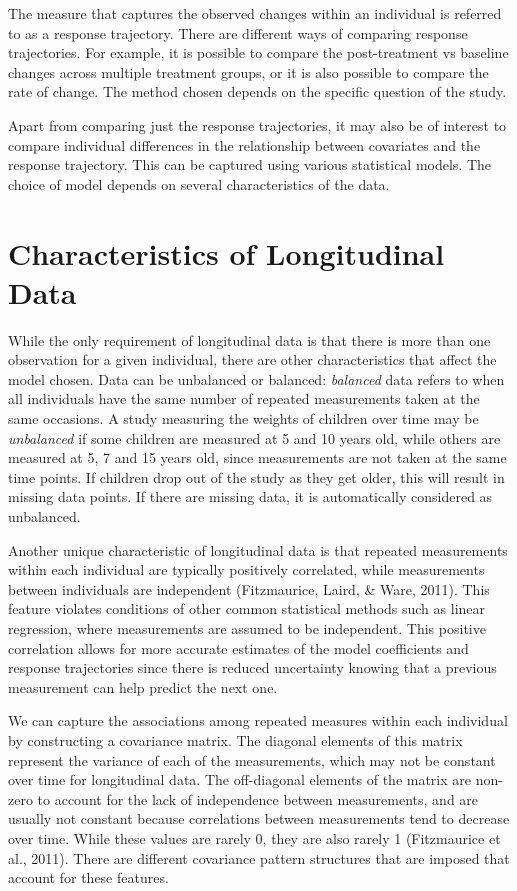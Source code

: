 \documentclass[12pt, twoside]{amherstthesis}
\begin{document}
The measure that captures the observed changes within an individual is referred to as a response trajectory. There are different ways of comparing response trajectories. For example, it is possible to compare the post-treatment vs baseline changes across multiple treatment groups, or it is also possible to compare the rate of change. The method chosen depends on the specific question of the study.

Apart from comparing just the response trajectories, it may also be of interest to compare individual differences in the relationship between covariates and the response trajectory. This can be captured using various statistical models. The choice of model depends on several characteristics of the data.

\hypertarget{characteristics-of-longitudinal-data}{%
\section{Characteristics of Longitudinal Data}\label{characteristics-of-longitudinal-data}}

While the only requirement of longitudinal data is that there is more than one observation for a given individual, there are other characteristics that affect the model chosen. Data can be unbalanced or balanced: \emph{balanced} data refers to when all individuals have the same number of repeated measurements taken at the same occasions. A study measuring the weights of children over time may be \emph{unbalanced} if some children are measured at 5 and 10 years old, while others are measured at 5, 7 and 15 years old, since measurements are not taken at the same time points. If children drop out of the study as they get older, this will result in missing data points. If there are missing data, it is automatically considered as unbalanced.

Another unique characteristic of longitudinal data is that repeated measurements within each individual are typically positively correlated, while measurements between individuals are independent (Fitzmaurice, Laird, \& Ware, 2011). This feature violates conditions of other common statistical methods such as linear regression, where measurements are assumed to be independent. This positive correlation allows for more accurate estimates of the model coefficients and response trajectories since there is reduced uncertainty knowing that a previous measurement can help predict the next one.

We can capture the associations among repeated measures within each individual by constructing a covariance matrix. The diagonal elements of this matrix represent the variance of each of the measurements, which may not be constant over time for longitudinal data. The off-diagonal elements of the matrix are non-zero to account for the lack of independence between measurements, and are usually not constant because correlations between measurements tend to decrease over time. While these values are rarely 0, they are also rarely 1 (Fitzmaurice et al., 2011). There are different covariance pattern structures that are imposed that account for these features.
\end{document}

